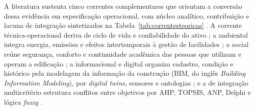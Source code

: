 A literatura sustenta cinco correntes complementares que orientam a conversão dessa evidência em especificação operacional, com núcleo analítico, contribuição e lacuna de integração sintetizados na Tabela~\ref{tab:correntesteoricas} \parencite{nageli_ciclovida_2019,nielsen_sustentabilidadefm_2016,alfalah_frameworkeducacional_2022,deng_bimdigitaltwins_2021,masmoudi_ahptopsis_2026}. A corrente técnica-operacional deriva de ciclo de vida e confiabilidade do ativo \parencite{nageli_ciclovida_2019,othman_manutenibilidadeesi_2023,chew_manutenibilidadeverde_2016,conejos_verticalgreenery_2019}; a ambiental integra energia, emissões e efeitos intertemporais à gestão de facilidades \parencite{nielsen_sustentabilidadefm_2016,opoku_futurofm_2022,okoro_sustainablefm_2023}; a social reúne segurança, conforto e continuidade acadêmica das pessoas que utilizam e operam a edificação \parencite{alfalah_frameworkeducacional_2022}; a informacional e digital organiza cadastro, condição e histórico pela modelagem da informação da construção (BIM, do inglês \textit{Building Information Modeling}), por \textit{digital twins}, sensores e ontologias \parencite{deng_bimdigitaltwins_2021,gispert_ontologiaativos_2025,goretti_bimoem_2023,motuziene_ventilacaoia_2025,wu_gnnvidautil_2025,das_iotai_2025}; e a de integração multicritério estrutura conflitos entre objetivos por AHP, TOPSIS, ANP, Delphi e lógica \textit{fuzzy} \parencite{alfalah_frameworkeducacional_2022,naji_campusdelphi_2023,masmoudi_ahptopsis_2026}.

